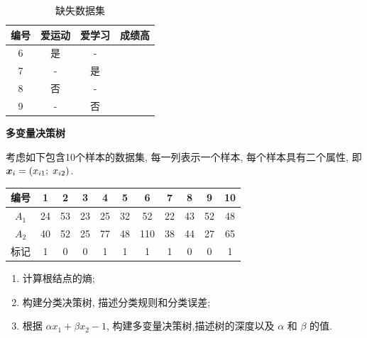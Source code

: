 \documentclass[answers]{exam}  %
\begin{document}
\begin{questions}
\begin{enumerate}
	\begin{table}[ht]
    \centering
    \caption{缺失数据集}\label{ch4_tab:artificial_testing_dataset2}
	\begin{tabular}{cccc}
		\hline 编号 & 爱运动 & 爱学习 & 成绩高 \\
		\hline 6 & 是 & - &  \\
		7 & - & 是 &  \\
		8 & 否 & - &  \\
		9 & - & 否 &  \\
		\hline
	\end{tabular}
	\end{table}
    
\end{enumerate}
	\begin{solution}
	\end{solution}


\question [20] \textbf{多变量决策树}

考虑如下包含10个样本的数据集, 每一列表示一个样本, 每个样本具有二个属性, 即${\boldsymbol{x}}_i = (x_{i1};\; x_{i2})$.
\begin{table}[ht]
    \begin{center}
    \begin{tabular}{ccccccccccc}
    \hline 编号 & 1 & 2 & 3 & 4 & 5 & 6 & 7 & 8 & 9 & 10 \\
    \hline $A_1$ & 24 & 53 & 23 & 25 & 32 & 52 & 22 & 43 & 52 & 48 \\ 
    $A_2$ & 40 & 52 & 25 & 77 & 48 & 110 & 38 & 44 & 27 & 65\\
    \hline 标记 & 1 & 0 & 0 & 1 & 1 & 1 & 1 & 0 & 0 & 1\\
    \hline
    \end{tabular}
    \end{center}
\end{table}
\begin{enumerate}
    \item 计算根结点的熵; 
    \item 构建分类决策树, 描述分类规则和分类误差; 
    \item 根据 $\alpha x_{1}+\beta x_{2}-1$,  构建多变量决策树,描述树的深度以及 $\alpha$ 和 $\beta$ 的值. 
\end{enumerate}
	\begin{solution}
	\end{solution}

\end{questions}
\end{document}
